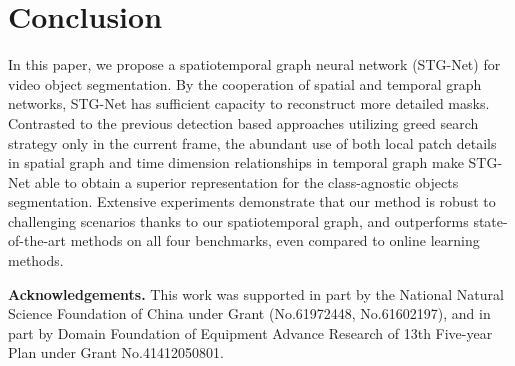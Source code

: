 \documentclass[letterpaper]{article} \usepackage{aaai21}  \usepackage{times}  \usepackage{helvet} \usepackage{courier}  \usepackage[hyphens]{url}  \usepackage{graphicx} \urlstyle{rm} \def\UrlFont{\rm}  \usepackage{graphicx}  \usepackage{natbib}  \usepackage{caption} \frenchspacing  \setlength{\pdfpagewidth}{8.5in}  \setlength{\pdfpageheight}{11in}  \usepackage{amsmath}
\begin{document}
\section{Conclusion}
In this paper, we propose a spatiotemporal graph neural network (STG-Net) for video object segmentation.
By the cooperation of spatial and temporal graph networks, STG-Net has sufficient capacity to reconstruct more detailed masks.
Contrasted to the previous detection based approaches utilizing greed search strategy only in the current frame, the abundant use of both local patch details in spatial graph and time dimension relationships in temporal graph make STG-Net able to obtain a superior representation for the class-agnostic objects segmentation.
Extensive experiments demonstrate that our method is robust to challenging scenarios thanks to our spatiotemporal graph, and outperforms state-of-the-art methods on all four benchmarks, even compared to online learning methods.

\clearpage
\noindent \textbf{Acknowledgements.} This work was supported in part by the National Natural Science Foundation of China under Grant (No.61972448, No.61602197), and in part by Domain Foundation of Equipment Advance Research of 13th Five-year Plan under Grant No.41412050801.


\end{document}
